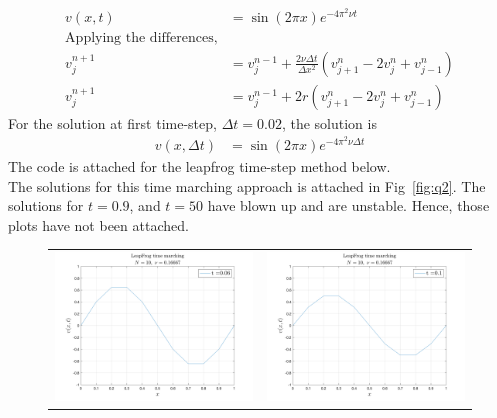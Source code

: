 \documentclass[11pt]{article}
\newcommand{\vnpj}{v^{n+1}_j}
\newcommand{\vnjp}{v^n_{j+1}}
\newcommand{\vnjm}{v^n_{j-1}}
\begin{document}
\begin{enumerate}
\begin{align*}
v(x,t) & = \sin(2\pi x)e^{-4\pi^2 \nu t} \\
\text{Applying the differences,} \\
\vnpj & = v^{n-1}_j + \frac{2\nu \Delta t}{\Delta x^2}\left(\vnjp - 2v^n_j + \vnjm \right) \\
\vnpj & = v^{n-1}_j + 2r\left(\vnjp - 2v^n_j + \vnjm \right)
\end{align*}
For the solution at first time-step, $\Delta t = 0.02$, the solution is 
\begin{align*}
v(x,\Delta t) & = \sin(2\pi x)e^{-4\pi^2 \nu \Delta t}
\end{align*}
The code is attached for the leapfrog time-step method below. \\
 
The solutions for this time marching approach is attached in Fig~\ref{fig:q2}. The solutions for $t=0.9$, and $t=50$ have blown up and are unstable. Hence, those plots have not been attached.
\begin{figure}[htp]
\begin{tabular}{cc}
\includegraphics[width=3.65in]{q2_t1} & \includegraphics[width=3.65in]{q2_t2}

\end{tabular}
\end{figure}
\end{enumerate}
\end{document}
